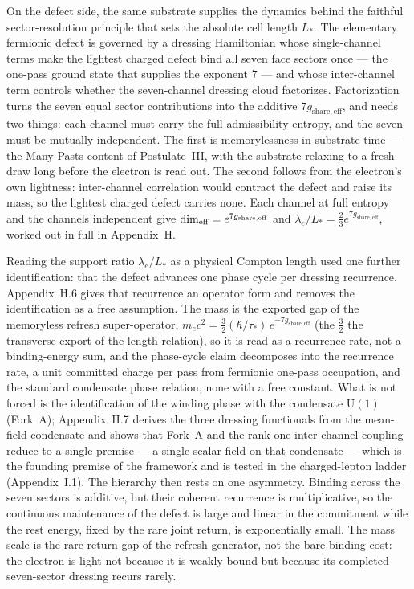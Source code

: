 \documentclass[11pt]{article}
\begin{document}
On the defect side, the same substrate supplies the dynamics behind the faithful sector-resolution principle that sets the absolute cell length $L_*$. The elementary fermionic defect is governed by a dressing Hamiltonian whose single-channel terms make the lightest charged defect bind all seven face sectors once --- the one-pass ground state that supplies the exponent $7$ --- and whose inter-channel term controls whether the seven-channel dressing cloud factorizes. Factorization turns the seven equal sector contributions into the additive $7g_{\mathrm{share,eff}}$, and needs two things: each channel must carry the full admissibility entropy, and the seven must be mutually independent. The first is memorylessness in substrate time --- the Many-Pasts content of Postulate~III, with the substrate relaxing to a fresh draw long before the electron is read out. The second follows from the electron's own lightness: inter-channel correlation would contract the defect and raise its mass, so the lightest charged defect carries none. Each channel at full entropy and the channels independent give $\dim_{\rm eff}=e^{7g_{\mathrm{share,eff}}}$ and $\lambda_e/L_*=\tfrac23 e^{7g_{\mathrm{share,eff}}}$, worked out in full in Appendix~H.

Reading the support ratio $\lambda_e/L_*$ as a physical Compton length used one further identification: that the defect advances one phase cycle per dressing recurrence. Appendix~H.6 gives that recurrence an operator form and removes the identification as a free assumption. The mass is the exported gap of the memoryless refresh super-operator, $m_ec^2=\tfrac32(\hbar/\tau_*)\,e^{-7g_{\mathrm{share,eff}}}$ (the $\tfrac32$ the transverse export of the length relation), so it is read as a recurrence rate, not a binding-energy sum, and the phase-cycle claim decomposes into the recurrence rate, a unit committed charge per pass from fermionic one-pass occupation, and the standard condensate phase relation, none with a free constant. What is not forced is the identification of the winding phase with the condensate $\mathrm{U}(1)$ (Fork~A); Appendix~H.7 derives the three dressing functionals from the mean-field condensate and shows that Fork~A and the rank-one inter-channel coupling reduce to a single premise --- a single scalar field on that condensate --- which is the founding premise of the framework and is tested in the charged-lepton ladder (Appendix~I.1). The hierarchy then rests on one asymmetry. Binding across the seven sectors is additive, but their coherent recurrence is multiplicative, so the continuous maintenance of the defect is large and linear in the commitment while the rest energy, fixed by the rare joint return, is exponentially small. The mass scale is the rare-return gap of the refresh generator, not the bare binding cost: the electron is light not because it is weakly bound but because its completed seven-sector dressing recurs rarely.
\end{document}
